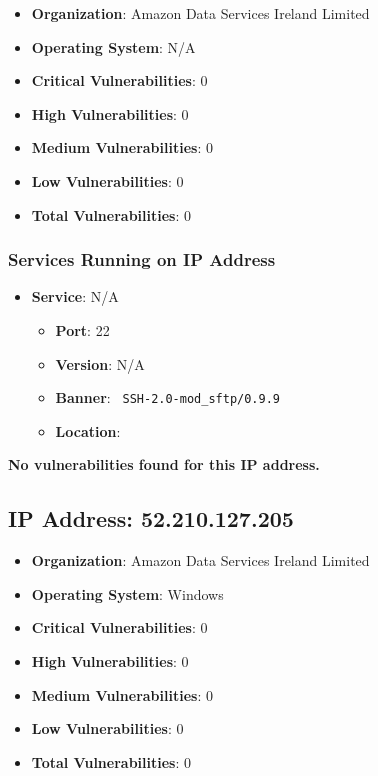 \documentclass{article}
\begin{document}
\begin{itemize}
    \item \textbf{Organization}: Amazon Data Services Ireland Limited
    \item \textbf{Operating System}:  N/A 
    \item \textbf{Critical Vulnerabilities}: 0
    \item \textbf{High Vulnerabilities}: 0
    \item \textbf{Medium Vulnerabilities}: 0
    \item \textbf{Low Vulnerabilities}: 0
    \item \textbf{Total Vulnerabilities}: 0
\end{itemize}

\subsubsection*{Services Running on IP Address}

\begin{itemize}
    
        \item \textbf{Service}: N/A
        \begin{itemize}
            \item \textbf{Port}: 22
            \item \textbf{Version}:  N/A 
            \item \textbf{Banner}: \texttt{
                SSH-2.0-mod\_sftp/0.9.9
            }
            \item \textbf{Location}: \href{  }{  }
        \end{itemize}
    
\end{itemize}


\textbf{No vulnerabilities found for this IP address.}




\clearpage



\subsection*{IP Address: 52.210.127.205}

\begin{itemize}
    \item \textbf{Organization}: Amazon Data Services Ireland Limited
    \item \textbf{Operating System}:  Windows 
    \item \textbf{Critical Vulnerabilities}: 0
    \item \textbf{High Vulnerabilities}: 0
    \item \textbf{Medium Vulnerabilities}: 0
    \item \textbf{Low Vulnerabilities}: 0
    \item \textbf{Total Vulnerabilities}: 0
\end{itemize}
\end{document}
